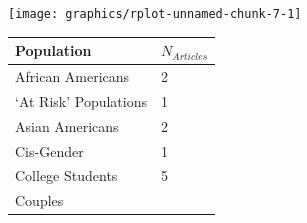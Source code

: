 \documentclass[]{tufte-handout}
\begin{document}
\texttt{[image: graphics/rplot-unnamed-chunk-7-1]}

\newpage


\begin{longtable}[]{@{}ll@{}}
\toprule
\begin{minipage}[b]{0.59\columnwidth}\raggedright\strut
Population\strut
\end{minipage} & \begin{minipage}[b]{0.21\columnwidth}\raggedright\strut
\(N_{Articles}\)\strut
\end{minipage}\tabularnewline
\midrule
\endhead
\begin{minipage}[t]{0.59\columnwidth}\raggedright\strut
African Americans\strut
\end{minipage} & \begin{minipage}[t]{0.21\columnwidth}\raggedright\strut
2\strut
\end{minipage}\tabularnewline
\begin{minipage}[t]{0.59\columnwidth}\raggedright\strut
`At Risk' Populations\strut
\end{minipage} & \begin{minipage}[t]{0.21\columnwidth}\raggedright\strut
1\strut
\end{minipage}\tabularnewline
\begin{minipage}[t]{0.59\columnwidth}\raggedright\strut
Asian Americans\strut
\end{minipage} & \begin{minipage}[t]{0.21\columnwidth}\raggedright\strut
2\strut
\end{minipage}\tabularnewline
\begin{minipage}[t]{0.59\columnwidth}\raggedright\strut
Cis-Gender\strut
\end{minipage} & \begin{minipage}[t]{0.21\columnwidth}\raggedright\strut
1\strut
\end{minipage}\tabularnewline
\begin{minipage}[t]{0.59\columnwidth}\raggedright\strut
College Students\strut
\end{minipage} & \begin{minipage}[t]{0.21\columnwidth}\raggedright\strut
5\strut
\end{minipage}\tabularnewline
\begin{minipage}[t]{0.59\columnwidth}\raggedright\strut
Couples\strut
\end{minipage} & \begin{minipage}[t]{0.21\columnwidth}\raggedright\strut

\end{minipage}
\end{longtable}
\end{document}
